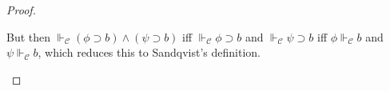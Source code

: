 \documentclass[10pt,a4paper]{amsart}
\newcommand{\base}[1]{\mathscr{#1}}
\newcommand{\support}[2]{\Vdash_{\base{#1}}#2}
\begin{document}
\begin{proof}
\begin{itemize}[align=left]
    \medskip
    
    \noindent But then $\support{C}{({\phi}\supset  {b})\wedge({\psi} \supset {b})}$ iff 
    $\support{C}{{\phi} \supset {b}}$ and $\support{C}{{\psi} \supset {b}}$
    iff ${\phi}\support{C}{{b}}$ and ${\psi}\support{C}{{b}}$, which reduces this to Sandqvist's definition. 
\end{itemize} \vspace{-4mm}
\end{proof}
\end{document}
